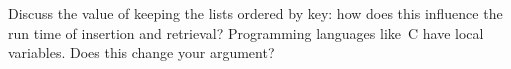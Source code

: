 Discuss the value of keeping the lists ordered by key: how does this
influence the run time of insertion and retrieval? Programming
languages like~C have local variables. Does this change your argument?
